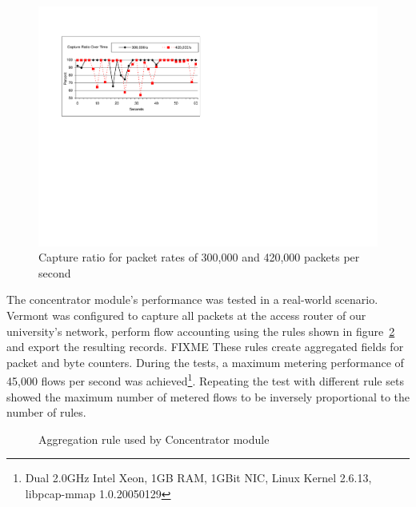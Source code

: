 \begin{figure}
\begin{center}
\includegraphics[scale=0.7]{gfx/sampler-perf3.pdf}
\caption{Capture ratio for packet rates of 300,000 and 420,000 packets per second}
\label{fig_perf_sampler}
\end{center}
\end{figure}

The concentrator module's performance was tested in a real-world scenario.
Vermont was configured to capture all packets at the access router of our university's network, perform flow accounting using the rules shown in figure~\ref{fig_rule} and export the resulting records.
FIXME These rules create aggregated fields for packet and byte counters.
During the tests, a maximum metering performance of 45,000 flows per second was achieved\footnote{Dual 2.0GHz Intel Xeon, 1GB RAM, 1GBit NIC, Linux Kernel 2.6.13, libpcap-mmap 1.0.20050129}. 
Repeating the test with different rule sets showed the maximum number of metered flows to be inversely proportional to the number of rules.

\begin{figure}
\centering
{}
\caption{Aggregation rule used by Concentrator module}
\label{fig_rule}
\end{figure}


